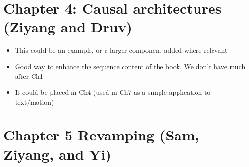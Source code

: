 \documentclass{article}
\begin{document}
\section{Chapter 4: Causal architectures (Ziyang and Druv)}

\begin{itemize}
    \item This could be an example, or a larger component added where relevant
    \item Good way to enhance the sequence content of the book. We don't have much after Ch1
    \item It could be placed in Ch4 (used in Ch7 as a simple application to text/motion)
\end{itemize}

\section{Chapter 5 Revamping (Sam, Ziyang, and Yi)}
\end{document}
